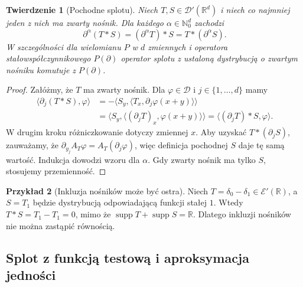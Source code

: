 \documentclass[11pt,a4paper]{article}
\numberwithin{equation}{section}
\theoremstyle{plain}
\newtheorem{twierdzenie}{Twierdzenie}[section]
\theoremstyle{definition}
\newtheorem{przyklad}[twierdzenie]{Przykład}
\theoremstyle{remark}
\newcommand{\R}{\mathbb R}
\newcommand{\N}{\mathbb N}
\DeclareMathOperator{\supp}{supp}
\begin{document}
\begin{twierdzenie}[Pochodne splotu]
\label{thm:convolution-derivative21}
Niech $T,S\in\mathcal D'(\R^d)$ i niech co najmniej
jeden z nich ma zwarty nośnik. Dla każdego
$\alpha\in\N_0^d$ zachodzi
\[
 \partial^\alpha(T*S)
 =(\partial^\alpha T)*S
 =T*(\partial^\alpha S).
\]
W szczególności dla wielomianu $P$ w $d$ zmiennych
i operatora stałowspółczynnikowego $P(\partial)$
operator splotu z ustaloną dystrybucją o zwartym
nośniku komutuje z $P(\partial)$.
\end{twierdzenie}
\begin{proof}
Załóżmy, że $T$ ma zwarty nośnik. Dla
$\varphi\in\mathcal D$ i $j\in\{1,\ldots,d\}$ mamy
\[
 \begin{aligned}
 \langle\partial_j(T*S),\varphi\rangle
 &=-\langle S_y,\langle T_x,\partial_j\varphi(x+y)\rangle\rangle\\
 &=\langle S_y,\langle(\partial_jT)_x,\varphi(x+y)\rangle\rangle
 =\langle(\partial_jT)*S,\varphi\rangle.
 \end{aligned}
\]
W drugim kroku różniczkowanie dotyczy zmiennej $x$.
Aby uzyskać $T*(\partial_jS)$, zauważamy, że
$\partial_{y_j}A_T\varphi=A_T(\partial_j\varphi)$,
więc definicja pochodnej $S$ daje tę samą wartość.
Indukcja dowodzi wzoru dla $\alpha$. Gdy zwarty
nośnik ma tylko $S$, stosujemy przemienność.
\end{proof}

\begin{przyklad}[Inkluzja nośników może być ostra]
\label{ex:support-strict21}
Niech $T=\delta_0-\delta_1\in\mathcal E'(\R)$,
a $S=T_1$ będzie dystrybucją odpowiadającą funkcji
stałej $1$. Wtedy $T*S=T_1-T_1=0$,
mimo że $\supp T+\supp S=\R$. Dlatego
inkluzji nośników nie można zastąpić równością.
\end{przyklad}

\subsection{Splot z funkcją testową i aproksymacja jedności}
\end{document}
